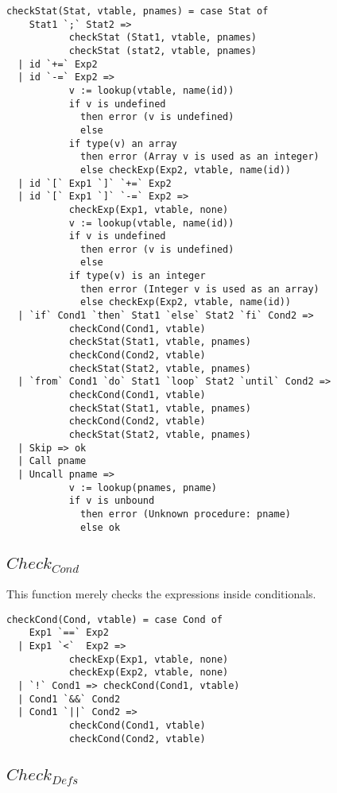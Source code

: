 \begin{verbatim}
checkStat(Stat, vtable, pnames) = case Stat of
    Stat1 `;` Stat2 =>
           checkStat (Stat1, vtable, pnames)
           checkStat (stat2, vtable, pnames)
  | id `+=` Exp2
  | id `-=` Exp2 =>
           v := lookup(vtable, name(id))
           if v is undefined
             then error (v is undefined)
             else
           if type(v) an array
             then error (Array v is used as an integer)
             else checkExp(Exp2, vtable, name(id))
  | id `[` Exp1 `]` `+=` Exp2
  | id `[` Exp1 `]` `-=` Exp2 =>
           checkExp(Exp1, vtable, none)
           v := lookup(vtable, name(id))
           if v is undefined
             then error (v is undefined)
             else
           if type(v) is an integer
             then error (Integer v is used as an array)
             else checkExp(Exp2, vtable, name(id))
  | `if` Cond1 `then` Stat1 `else` Stat2 `fi` Cond2 =>
           checkCond(Cond1, vtable)
           checkStat(Stat1, vtable, pnames)
           checkCond(Cond2, vtable)
           checkStat(Stat2, vtable, pnames)
  | `from` Cond1 `do` Stat1 `loop` Stat2 `until` Cond2 =>
           checkCond(Cond1, vtable)
           checkStat(Stat1, vtable, pnames)
           checkCond(Cond2, vtable)
           checkStat(Stat2, vtable, pnames)
  | Skip => ok
  | Call pname
  | Uncall pname =>
           v := lookup(pnames, pname)
           if v is unbound
             then error (Unknown procedure: pname)
             else ok
\end{verbatim}

\subsection{$Check_{Cond}$}

This function merely checks the expressions inside conditionals. \\

\begin{verbatim}
checkCond(Cond, vtable) = case Cond of
    Exp1 `==` Exp2
  | Exp1 `<`  Exp2 =>
           checkExp(Exp1, vtable, none)
           checkExp(Exp2, vtable, none)
  | `!` Cond1 => checkCond(Cond1, vtable)
  | Cond1 `&&` Cond2
  | Cond1 `||` Cond2 =>
           checkCond(Cond1, vtable)
           checkCond(Cond2, vtable)
\end{verbatim}

\subsection{$Check_{Defs}$}

